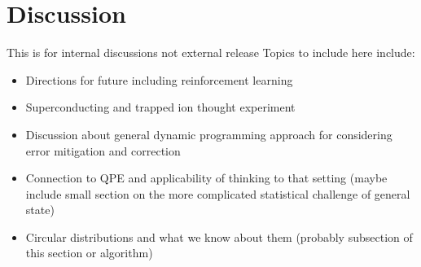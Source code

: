 \section{Discussion}
This is for internal discussions not external release
Topics to include here include:
\begin{itemize}
	\item Directions for future including reinforcement learning
	\item Superconducting and trapped ion thought experiment
	\item Discussion about general dynamic programming approach for considering error mitigation and correction
	\item Connection to QPE and applicability of thinking to that setting (maybe include small section on the more complicated statistical challenge of general state)
	\item Circular distributions and what we know about them (probably subsection of this section or algorithm)
\end{itemize}

